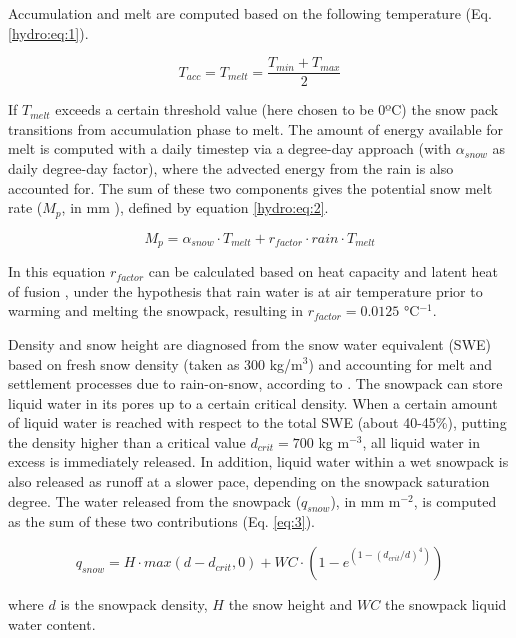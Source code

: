 Accumulation and melt are computed based on the following temperature (Eq. \ref{hydro:eq:1}).

\begin{equation} \label{hydro:eq:1}
 T_{acc} = T_{melt} = \frac{T_{min} + T_{max}}{2}
\end{equation} 

If $T_{melt}$ exceeds a certain threshold value (here chosen to be 0ºC) the snow pack transitions from accumulation phase to melt. The amount of energy available for melt is computed with a daily timestep via a degree-day approach (with $\alpha_{snow}$ as daily degree-day factor), where the advected energy from the rain is also accounted for. The sum of these two components gives the potential snow melt rate ($M_{p}$, in mm ), defined by equation \ref{hydro:eq:2}.

\begin{equation} \label{hydro:eq:2}
 M_{p} = \alpha_{snow} \cdot T_{melt} + r_{factor} \cdot rain \cdot T_{melt} 
\end{equation} 

In this equation $r_{factor}$ can be calculated based on heat capacity and latent heat of fusion , under the hypothesis that rain water is at air temperature prior to warming and melting the snowpack, resulting in $r_{factor}=0.0125$ °C$^{-1}$. 

Density and snow height are diagnosed from the snow water equivalent (SWE) based on fresh snow density (taken as 300 kg/m$^{3}$) and accounting for melt and settlement processes due to rain-on-snow, according to \citet{bertle_effect_1966}. The snowpack can store liquid water in its pores up to a certain critical density. When a certain amount of liquid water is reached with respect to the total SWE (about 40-45\%), putting the density higher than a critical value $d_{crit}=700$ kg m$^{-3}$, all liquid water in excess is immediately released. In addition, liquid water within a wet snowpack is also released as runoff at a slower pace, depending on the snowpack saturation degree. The water released from the snowpack ($q_{snow}$), in mm m$^{-2}$, is computed as the sum of these two contributions  (Eq. \ref{eq:3}).

\begin{equation} \label{hydro:eq:3}
q_{snow} = H \cdot max(d - d_{crit}, 0) + WC \cdot (1-e^{(1-(d_{crit}/d)^4)})
\end{equation} 

where $d$ is the snowpack density, $H$ the snow height and $WC$ the snowpack liquid water content. 

